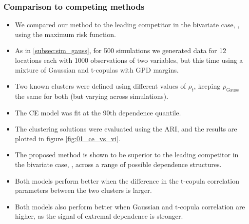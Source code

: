 \documentclass{article}
\numberwithin{equation}{section}
\begin{document}
\subsubsection{Comparison to competing methods} \label{subsubsec:sim_competing_methods}



\begin{itemize}
  \item We compared our method to the leading competitor in the bivariate case, \cite{Vignotto2021}, using the maximum risk function.
  \item As in \ref{subsec:sim_gauss}, for 500 simulations we generated data for 12 locations each with 1000 observations of two variables, but this time using a mixture of Gaussian and t-copulas with GPD margins. 
  \item Two known clusters were defined using different values of $\rho_t$, keeping $\rho_{\text{Gauss}}$ the same for both (but varying across simulations).
  \item The CE model was fit at the 90th dependence quantile. 
  \item The clustering solutions were evaluated using the ARI, and the results are plotted in figure \ref{fig:01_ce_vs_vi}.
  \item The proposed method is shown to be superior to the leading competitor in the bivariate case, \cite{Vignotto2021}, across a range of possible dependence structures.
  \item Both models perform better when the difference in the t-copula correlation parameters between the two clusters is larger.
  \item Both models also perform better when Gaussian and t-copula correlation are higher, as the signal of extremal dependence is stronger. 
\end{itemize}
\end{document}
